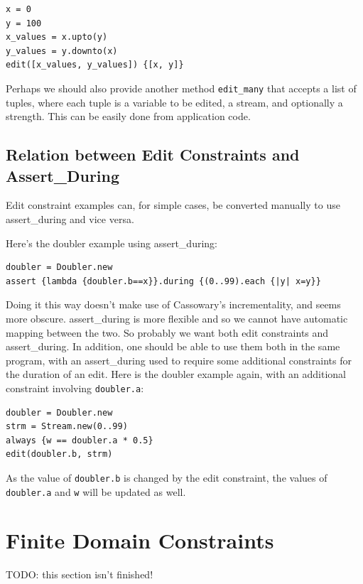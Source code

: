 \documentclass[11pt]{article}
\begin{document}
\begin{lstlisting}
x = 0
y = 100
x_values = x.upto(y)
y_values = y.downto(x)
edit([x_values, y_values]) {[x, y]}
\end{lstlisting}

Perhaps we should also provide another method \lstinline{edit_many}
that accepts a list of tuples, where each tuple is a variable to be
edited, a stream, and optionally a strength. This can be easily done
from application code.

\subsection{Relation between Edit Constraints and Assert\_During}

Edit constraint examples can, for simple cases, be converted manually
to use assert\_during and vice versa.

Here's the doubler example using assert\_during:

\begin{lstlisting}
doubler = Doubler.new
assert {lambda {doubler.b==x}}.during {(0..99).each {|y| x=y}}
\end{lstlisting}

Doing it this way doesn't make use of Cassowary's incrementality, and
seems more obscure. assert\_during is more flexible and so we cannot
have automatic mapping between the two. So probably we want both edit
constraints and assert\_during.  In addition, one should be able to
use them both in the same program, with an assert\_during used to
require some additional constraints for the duration of an edit.  
Here is the doubler example again, with an additional constraint
involving \lstinline{doubler.a}:

\begin{lstlisting}
doubler = Doubler.new
strm = Stream.new(0..99)
always {w == doubler.a * 0.5}
edit(doubler.b, strm)
\end{lstlisting}

As the value of \lstinline{doubler.b} is changed by the edit constraint, the
values of \lstinline{doubler.a} and \lstinline{w} will be updated as well.

\section{Finite Domain Constraints}

TODO: this section isn't finished!
\end{document}
